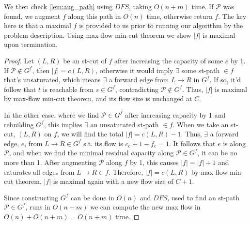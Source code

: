 \documentclass{article}
\begin{document}
	We then check \ref{lem:aug_path} using $DFS$, taking $O(n+m)$ time. If $\mathcal{P}$ was found, we augment $f$ along this path in $O(n)$ time, otherwise return $f$. The key here is that a maximal $f$ is provided to us prior to running our algorithm by the problem description. Using max-flow min-cut theorem we show $|f|$ is maximal upon termination.

\begin{proof}
	Let $(L,R)$ be an st-cut of $f$ after increasing the capacity of some $e$ by 1. If $\mathcal{P} \notin G^f$, then $|f| = c(L,R)$, otherwise it would imply $\exists$ some st-path $\in f$ that's unsaturated, which means $\exists$ a forward edge from $L \to R$ in $G^f$. If so, it'd follow that $t$ is reachable from $s \in G^f$, contradicting  $\mathcal{P} \notin G^f$. Thus, $|f|$ is maximal by max-flow min-cut theorem, and its flow size is unchanged at $C$.
	
	In the other case, where we find $\mathcal{P} \in G^f$ after increasing capacity by 1 and rebuilding $G^f$, this implies $\exists$ an unsaturated st-path $\in f$. When we take an st-cut, $(L,R)$ on $f$, we will find the total $|f| = c(L,R) -1$. Thus, $\exists$ a forward edge, $e$, from $L \to R \in G^f$ s.t. its flow is $c_e +1- f_e = 1$. It follows that $e$ is along $\mathcal{P}$, and when we find the minimal residual capacity along $\mathcal{P} \in G^f$, it can be no more than 1. After augmenting $\mathcal{P}$ along $f$ by 1, this causes $|f| = |f|+1$ and saturates all edges from $L \to R \in f$. Therefore, $|f| = c(L,R)$ by max-flow min-cut theorem, $|f|$ is maximal again with a new flow size of $C+1$.
	
	Since constructing $G^f$ can be done in $O(n)$ and $DFS$, used to find an st-path $\mathcal{P} \in G^f$, runs in $O(n+m)$ we can compute the new max flow in $O(n) + O(n+m) = O(n+m)$ time.
\end{proof}
 
\end{document}
